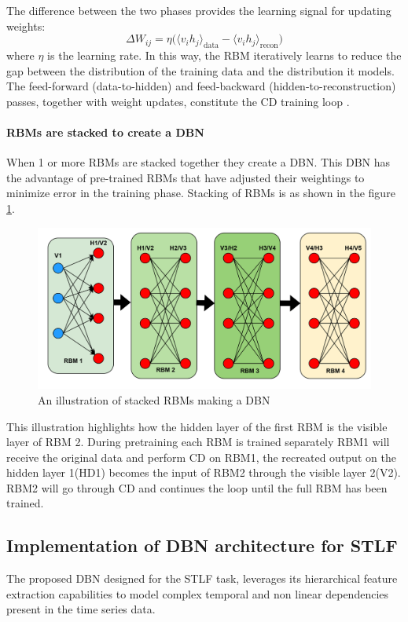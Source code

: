 The difference between the two phases provides the learning signal for updating weights:
\[
\Delta W_{ij} = \eta \Big( \langle v_i h_j \rangle_{\text{data}} - \langle v_i h_j \rangle_{\text{recon}} \Big)
\tag{14}
\label{eqn:14}
\]
where $\eta$ is the learning rate. In this way, the RBM iteratively learns to reduce the gap between the distribution of the training data and the distribution it models. The feed-forward (data-to-hidden) and feed-backward (hidden-to-reconstruction) passes, together with weight updates, constitute the CD training loop \cite{RBM_GeeksforGeeks}.

\paragraph{RBMs are stacked to create a DBN} When 1 or more RBMs are stacked together they create a DBN. This DBN has the advantage of pre-trained RBMs that have adjusted their weightings to minimize error in the training phase. Stacking of RBMs is as shown in the figure \ref{fig:correctrbm}.
\begin{figure}[h]
	\centering
	\includegraphics[width=0.7\linewidth]{Chapters/images/CORRECT_RBM}
	\caption{An illustration of stacked RBMs making a DBN}
	\label{fig:correctrbm}
\end{figure} 
This illustration highlights how the hidden layer of the first RBM is the visible layer of RBM 2. During pretraining each RBM is trained separately RBM1 will receive the original data and perform CD on RBM1, the recreated output on the hidden layer 1(HD1) becomes the input of RBM2 through the visible layer 2(V2). RBM2 will go through CD and continues the loop until the full RBM has been trained.

\subsection{Implementation of DBN architecture for STLF}
The proposed DBN designed for the STLF task, leverages its hierarchical feature extraction capabilities to model complex temporal and non linear dependencies present in the time series data.


